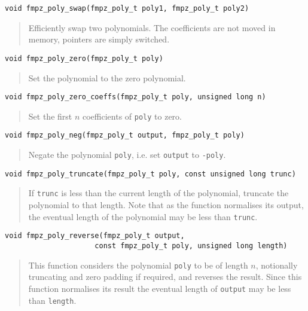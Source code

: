 \documentclass[a4paper,10pt]{article}
\newcommand{\code}{\lstinline}
\begin{document}
\begin{lstlisting}
void fmpz_poly_swap(fmpz_poly_t poly1, fmpz_poly_t poly2)
\end{lstlisting}
\begin{quote}
Efficiently swap two polynomials. The coefficients are not moved in memory, pointers are simply switched. \end{quote}

\begin{lstlisting}
void fmpz_poly_zero(fmpz_poly_t poly) 
\end{lstlisting}
\begin{quote}
Set the polynomial to the zero polynomial.
\end{quote}

\begin{lstlisting}
void fmpz_poly_zero_coeffs(fmpz_poly_t poly, unsigned long n) 
\end{lstlisting}
\begin{quote}
Set the first $n$ coefficients of \code{poly} to zero. 
\end{quote}

\begin{lstlisting}
void fmpz_poly_neg(fmpz_poly_t output, fmpz_poly_t poly) 
\end{lstlisting}
\begin{quote}
Negate the polynomial \code{poly}, i.e. set \code{output} to \code{-poly}.
\end{quote}

\begin{lstlisting}
void fmpz_poly_truncate(fmpz_poly_t poly, const unsigned long trunc)
\end{lstlisting}
\begin{quote}
If \code{trunc} is less than the current length of the polynomial, truncate the polynomial to that length. Note that as the function normalises its output, the eventual length of the polynomial may be less than \code{trunc}.
\end{quote}

\begin{lstlisting}
void fmpz_poly_reverse(fmpz_poly_t output, 
                     const fmpz_poly_t poly, unsigned long length) 
\end{lstlisting}
\begin{quote}
This function considers the polynomial \code{poly} to be of length $n$, notionally truncating and zero padding if required, and reverses the result. Since this function normalises its result the eventual length of \code{output} may be less than \code{length}.
\end{quote}
\end{document}
